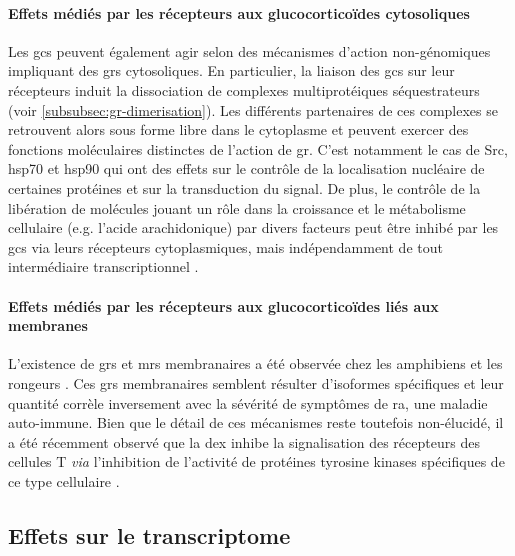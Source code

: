 \documentclass[../main.tex]{subfiles}
\begin{document}
\paragraph{Effets médiés par les récepteurs aux glucocorticoïdes cytosoliques}
Les \glspl{gc} peuvent également agir selon des mécanismes d'action non-génomiques impliquant des \glspl{gr} cytosoliques.
En particulier, la liaison des \glspl{gc} sur leur récepteurs induit la dissociation de complexes multiprotéiques séquestrateurs (voir \autoref{subsubsec:gr-dimerisation}).
Les différents partenaires de ces complexes se retrouvent alors sous forme libre dans le cytoplasme et peuvent exercer des fonctions moléculaires distinctes de l'action de \gls{gr}.
C'est notamment le cas de \gls{Src}, \gls{hsp70} et \gls{hsp90} \citep{Croxtall2000,Marchetti2003,Tumlin1997} qui ont des effets sur le contrôle de la localisation nucléaire de certaines protéines et sur la transduction du signal.
De plus, le contrôle de la libération de molécules jouant un rôle dans la croissance et le métabolisme cellulaire (e.g. l'acide arachidonique) par divers facteurs peut être inhibé par les \glspl{gc} via leurs récepteurs cytoplasmiques, mais indépendamment de tout intermédiaire transcriptionnel \citep{Croxtall2000}.

\paragraph{Effets médiés par les récepteurs aux glucocorticoïdes liés aux membranes}
L'existence de \glspl{gr} et \glspl{mr} membranaires a été observée chez les amphibiens et les rongeurs \citep{Orchinik1991,Gametchu1999}.
Ces \glspl{gr} membranaires semblent résulter d'isoformes spécifiques \citep{Bartholome2004} et leur quantité corrèle inversement avec la sévérité de symptômes de \gls{ra}, une maladie auto-immune.
Bien que le détail de ces mécanismes reste toutefois non-élucidé, il a été récemment observé que la \gls{dex} inhibe la signalisation des récepteurs des cellules T \textit{via} l'inhibition de l'activité de protéines tyrosine kinases spécifiques de ce type cellulaire \citep{Lowenberg2006}.


\subsection{Effets sur le transcriptome}
\end{document}
